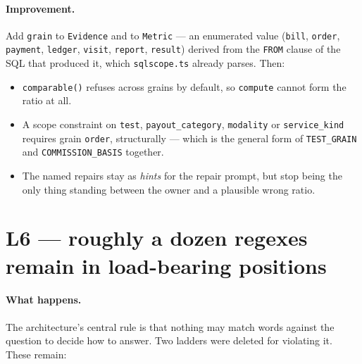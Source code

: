 \documentclass[11pt,a4paper]{report}
\newcommand{\file}[1]{\texttt{\small #1}}
\newcommand{\code}[1]{\texttt{\small #1}}
\begin{document}
\paragraph{Improvement.} Add \code{grain} to \code{Evidence} and to \code{Metric} --- an enumerated
value (\code{bill}, \code{order}, \code{payment}, \code{ledger}, \code{visit}, \code{report},
\code{result}) derived from the \code{FROM} clause of the SQL that produced it, which
\file{sqlscope.ts} already parses. Then:
\begin{itemize}[leftmargin=*,itemsep=1pt]
\item \code{comparable()} refuses across grains by default, so \code{compute} cannot form the ratio
      at all.
\item A scope constraint on \code{test}, \code{payout\_category}, \code{modality} or
      \code{service\_kind} requires grain \code{order}, structurally --- which is the general form
      of \code{TEST\_GRAIN} and \code{COMMISSION\_BASIS} together.
\item The named repairs stay as \emph{hints} for the repair prompt, but stop being the only thing
      standing between the owner and a plausible wrong ratio.
\end{itemize}

\section{L6 --- roughly a dozen regexes remain in load-bearing positions}

\paragraph{What happens.} The architecture's central rule is that nothing may match words against
the question to decide how to answer. Two ladders were deleted for violating it. These remain:
\end{document}
